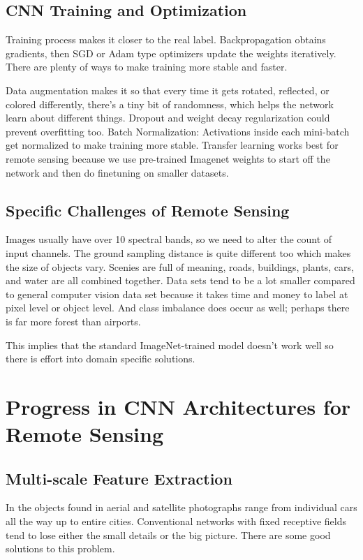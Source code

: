 \documentclass[12pt,a4paper]{article}
\begin{document}
\subsection{CNN Training and Optimization}
Training process makes it closer to the real label. Backpropagation obtains gradients, then SGD or Adam type optimizers update the weights iteratively. There are plenty of ways to make training more stable and faster.

Data augmentation makes it so that every time it gets rotated, reflected, or colored differently, there’s a tiny bit of randomness, which helps the network learn about different things. Dropout and weight decay regularization could prevent overfitting too. Batch Normalization: Activations inside each mini-batch get normalized to make training more stable. Transfer learning works best for remote sensing because we use pre-trained Imagenet weights to start off the network and then do finetuning on smaller datasets.

\subsection{Specific Challenges of Remote Sensing}
Images usually have over 10 spectral bands, so we need to alter the count of input channels. The ground sampling distance is quite different too which makes the size of objects vary. Scenies are full of meaning, roads, buildings, plants, cars, and water are all combined together. Data sets tend to be a lot smaller compared to general computer vision data set because it takes time and money to label at pixel level or object level. And class imbalance does occur as well; perhaps there is far more forest than airports.

This implies that the standard ImageNet-trained model doesn’t work well so there is effort into domain specific solutions.

\section{Progress in CNN Architectures for Remote Sensing}
\label{sec:developments}
\subsection{Multi-scale Feature Extraction}
In the objects found in aerial and satellite photographs range from individual cars all the way up to entire cities. Conventional networks with fixed receptive fields tend to lose either the small details or the big picture. There are some good solutions to this problem.
\end{document}

